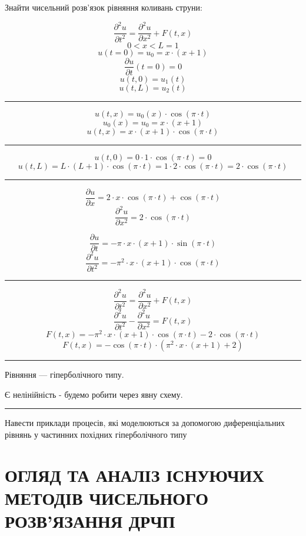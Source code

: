 \documentclass{article}
\begin{document}
    Знайти чисельний розв’язок рівняння коливань струни:

    $$ \frac{\partial^2{u}}{\partial{t^2}} = \frac{\partial^2{u}}{\partial{x^2}} + F(t, x) $$
    $$ 0 < x < L = 1 $$
    $$ u(t = 0) = u_0 = x \cdot (x+1) $$
    $$ \frac{\partial{u}}{\partial{t}}(t = 0) = 0 $$
    $$ u(t, 0) = u_1(t) $$
    $$ u(t, L) = u_2(t) $$

    \hrule

    $$ u(t,x) = u_0(x) \cdot \cos(\pi \cdot t) $$
    $$ u_0(x) = u_0 = x \cdot (x+1) $$
    $$ u(t,x) = x \cdot (x+1) \cdot \cos(\pi \cdot t) $$

    \hrule

    $$ u(t,0) = 0 \cdot 1 \cdot \cos(\pi \cdot t) = 0 $$
    $$ u(t, L) = L \cdot (L+1) \cdot \cos(\pi \cdot t) = 1 \cdot 2 \cdot \cos(\pi \cdot t) = 2 \cdot \cos(\pi \cdot t) $$

    \hrule

    $$ \frac{\partial{u}}{\partial{x}} = 2 \cdot x \cdot \cos(\pi \cdot t) + \cos(\pi \cdot t) $$
    $$ \frac{\partial^2{u}}{\partial{x^2}} = 2 \cdot \cos(\pi \cdot t) $$

    $$ \frac{\partial{u}}{\partial{t}} = -\pi \cdot x \cdot (x+1) \cdot \sin(\pi \cdot t) $$
    $$ \frac{\partial^2{u}}{\partial{t^2}} = -\pi^2 \cdot x \cdot (x+1) \cdot \cos(\pi \cdot t) $$

    \hrule

    $$ \frac{\partial^2{u}}{\partial{t^2}} = \frac{\partial^2{u}}{\partial{x^2}} + F(t, x) $$
    $$ \frac{\partial^2{u}}{\partial{t^2}} - \frac{\partial^2{u}}{\partial{x^2}} = F(t, x) $$
    $$ F(t, x) = -\pi^2 \cdot x \cdot (x+1) \cdot \cos(\pi \cdot t) - 2 \cdot \cos(\pi \cdot t) $$
    $$ F(t, x) = -\cos(\pi \cdot t) \cdot \left(\pi^2 \cdot x \cdot (x+1) + 2\right) $$

    \hrule

    Рівняння --- гіперболічного типу.
    
    Є нелінійність - будемо робити через явну схему.

    \hrule

    Навести приклади процесів, які моделюються за допомогою диференціальних рівнянь у частинних похідних гіперболічного типу
    
    \newpage
    \section{ОГЛЯД ТА АНАЛІЗ ІСНУЮЧИХ МЕТОДІВ ЧИСЕЛЬНОГО РОЗВ’ЯЗАННЯ ДРЧП}
\end{document}
